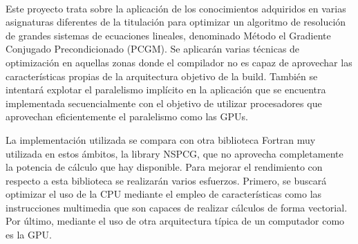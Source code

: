 \chapter*{}






\cleardoublepage
\thispagestyle{empty}

\begin{center}
{\large\bfseries \myTitle}\\
\end{center}
\begin{center}
\myName\\
\end{center}

\\

\vspace{0.7cm}
\\

Este proyecto trata sobre la aplicación de los conocimientos adquiridos en varias
asignaturas diferentes de la titulación para optimizar un algoritmo de resolución de
grandes sistemas de ecuaciones lineales, denominado Método el Gradiente Conjugado Precondicionado (PCGM).
Se aplicarán varias técnicas de optimización en aquellas zonas donde el compilador no es capaz de aprovechar
las características propias de la arquitectura objetivo de la build. También se intentará
explotar el paralelismo implícito en la aplicación que se encuentra implementada secuencialmente
con el objetivo de utilizar procesadores que aprovechan eficientemente el paralelismo como las GPUs.

La implementación utilizada se compara con otra biblioteca Fortran muy utilizada en estos ámbitos,
la library NSPCG, que no aprovecha completamente la potencia de cálculo que hay disponible.
Para mejorar el rendimiento con respecto a esta biblioteca se realizarán varios esfuerzos.
Primero, se buscará optimizar el uso de la CPU mediante el empleo de características
como las instrucciones multimedia que son capaces de realizar cálculos de forma vectorial. Por último,
mediante el uso de otra arquitectura típica de un computador como es la GPU.

\cleardoublepage


